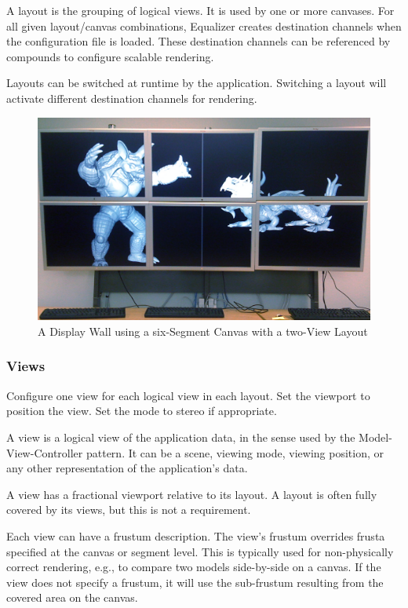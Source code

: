 \documentclass[10pt,a4]{scrartcl}
\begin{document}
A layout is the grouping of logical views. It is used by one or more
canvases. For all given layout/canvas combinations, Equalizer creates
destination channels when the configuration file is loaded. These
destination channels can be referenced by compounds to configure
scalable rendering.

Layouts can be switched at runtime by the application. Switching a
layout will activate different destination channels for rendering.

\begin{figure}[ht!]\center
  \includegraphics[width=.9\textwidth]{images/wallLayout.jpg}
  {\caption{A Display Wall using a six-Segment Canvas with a two-View Layout}}
\end{figure}

\subsubsection{Views}

Configure one \textsf{view} for each logical view in each layout. Set the
\textsf{viewport} to position the view. Set the mode to stereo if appropriate.

A view is a logical view of the application data, in the sense used by
the Model-View-Controller pattern. It can be a scene, viewing mode,
viewing position, or any other representation of the application's data.

A view has a fractional viewport relative to its layout.  A layout
is often fully covered by its views, but this is not a requirement.

Each view can have a frustum description. The view's frustum overrides
frusta specified at the canvas or segment level. This is typically used
for non-physically correct rendering, e.g., to compare two models
side-by-side on a canvas. If the view does not specify a frustum, it
will use the sub-frustum resulting from the covered area on the canvas.
\end{document}
